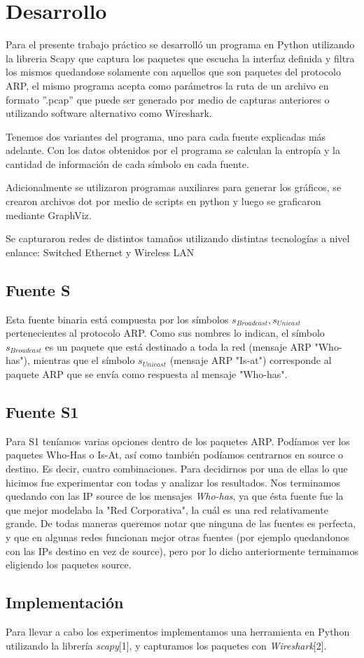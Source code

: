 \section{Desarrollo}

Para el presente trabajo práctico se desarrolló un programa en Python utilizando la libreria Scapy que captura los paquetes que escucha la interfaz definida y filtra los mismos quedandose solamente con aquellos que son paquetes del protocolo ARP, el mismo programa acepta como parámetros la ruta de un archivo en formato ''.pcap'' que puede ser generado por medio de capturas anteriores o utilizando software alternativo como Wireshark.

Tenemos dos variantes del programa, uno para cada fuente explicadas más adelante. Con los datos obtenidos por el programa se calculan la entropía y la cantidad de información de cada símbolo en cada fuente.

Adicionalmente se utilizaron programas auxiliares para generar los gráficos, se crearon archivos dot por medio de scripts en python y luego se graficaron mediante GraphViz.

Se capturaron redes de distintos tamaños utilizando distintas tecnologías a nivel enlance: Switched Ethernet y Wireless LAN


\subsection{Fuente S}
Esta fuente binaria está compuesta por los símbolos ${s_{Broadcast}, s_{Unicast}}$ pertenecientes al protocolo ARP. Como sus nombres lo indican, el símbolo $s_{Broadcast}$ es un paquete que está destinado a toda la red (mensaje ARP "Who-has"), mientras que el símbolo $s_{Unicast}$ (mensaje ARP "Is-at") corresponde al paquete ARP que se envía como respuesta al mensaje "Who-has".

\subsection{Fuente S1}
Para S1 teníamos varias opciones dentro de los paquetes ARP. Podíamos ver los paquetes Who-Has o Is-At, así como también podíamos centrarnos en source o destino. Es decir, cuatro combinaciones. Para decidirnos por una de ellas lo que hicimos fue experimentar con todas y analizar los resultados. Nos terminamos quedando con las IP source de los mensajes \textit{Who-has}, ya que ésta fuente fue la que mejor modelaba la "Red Corporativa", la cuál es una red relativamente grande. De todas maneras queremos notar que ninguna de las fuentes es perfecta, y que en algunas redes funcionan mejor otras fuentes (por ejemplo quedandonos con las IPs destino en vez de source), pero por lo dicho anteriormente terminamos eligiendo los paquetes source.

\subsection{Implementación}
Para llevar a cabo los experimentos implementamos una herramienta en Python utilizando la librería \textit{scapy}[1], y capturamos los paquetes con \textit{Wireshark}[2].

